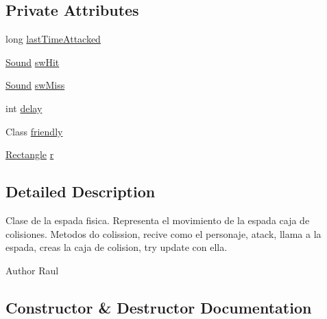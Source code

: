 \subsection*{Private Attributes}
\begin{DoxyCompactItemize}
\item 
long \mbox{\hyperlink{classitems_1_1weapons_1_1_sword_a571fe801555f1c19f90b78ad683ed660}{last\+Time\+Attacked}}
\item 
\mbox{\hyperlink{classorg_1_1newdawn_1_1slick_1_1_sound}{Sound}} \mbox{\hyperlink{classitems_1_1weapons_1_1_sword_a83b89e36fa2e2f6f6d6aa6827657cbb5}{sw\+Hit}}
\item 
\mbox{\hyperlink{classorg_1_1newdawn_1_1slick_1_1_sound}{Sound}} \mbox{\hyperlink{classitems_1_1weapons_1_1_sword_a33baf7fba31bad5610a1ce68142debf9}{sw\+Miss}}
\item 
int \mbox{\hyperlink{classitems_1_1weapons_1_1_sword_a8d69cc681b95f364381987f28546f382}{delay}}
\item 
Class \mbox{\hyperlink{classitems_1_1weapons_1_1_sword_a63363009ee0969e2deb6d1f3af957d58}{friendly}}
\item 
\mbox{\hyperlink{classorg_1_1newdawn_1_1slick_1_1geom_1_1_rectangle}{Rectangle}} \mbox{\hyperlink{classitems_1_1weapons_1_1_sword_a0e6a4807a1682dc6790d287b01077da9}{r}}
\end{DoxyCompactItemize}


\subsection{Detailed Description}
Clase de la espada fisica. Representa el movimiento de la espada caja de colisiones. Metodos do colission, recive como el personaje, atack, llama a la espada, creas la caja de colision, try update con ella.

\begin{DoxyAuthor}{Author}
Raul 
\end{DoxyAuthor}


\subsection{Constructor \& Destructor Documentation}
\mbox{\label{classitems_1_1weapons_1_1_sword_a858d8a5d8fb4356c393ddd8dd726d375}} 
